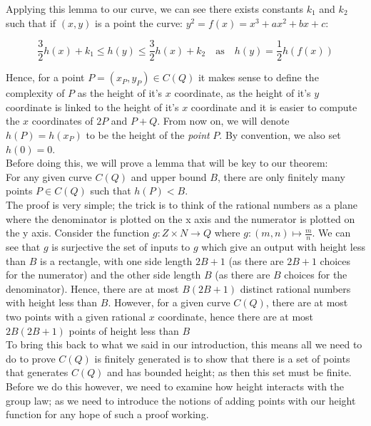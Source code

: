 \documentclass{article}
\begin{document}
Applying this lemma to our curve, we can see there exists constants $k_1$ and $k_2$ such that if $(x, y)$ is a point the curve: $y^2 = f(x) = x^3 + ax^2 + bx + c$:

\[ \frac{3}{2} h(x) + k_1 \leq h(y) \leq \frac{3}{2} h(x) + k_2 \quad \text{as} \quad h(y) = \frac{1}{2}h(f(x)) \]

Hence, for a point $P = (x_P, y_P) \in C(Q)$ it makes sense to define the complexity of $P$ as the height of it's $x$ coordinate, as the height of it's $y$ coordinate is linked to the height of it's $x$ coordinate and it is easier to compute the $x$ coordinates of $2P$ and $P + Q$. From now on, we will denote $h(P) = h(x_P)$ to be the height of the \emph{point} $P$. By convention, we also set $h(0) = 0$.\\

Before doing this, we will prove a lemma that will be key to our theorem:\\

For any given curve $C(Q)$ and upper bound $B$, there are only finitely many points $P \in C(Q)$ such that $h(P) < B$.\\

The proof is very simple; the trick is to think of the rational numbers as a plane where the denominator is plotted on the x axis and the numerator is plotted on the y axis. Consider the function $g: Z \times N \rightarrow Q$ where $g: (m, n) \mapsto \frac{m}{n}$. We can see that $g$ is surjective the set of inputs to $g$ which give an output with height less than $B$ is a rectangle, with one side length $2B + 1$ (as there are $2B + 1$ choices for the numerator) and the other side length $B$ (as there are $B$ choices for the denominator). Hence, there are at most $B(2B + 1)$ distinct rational numbers with height less than $B$. However, for a given curve $C(Q)$, there are at most two points with a given rational $x$ coordinate, hence there are at most $2B(2B + 1)$ points of height less than $B$\\


To bring this back to what we said in our introduction, this means all we need to do to prove $C(Q)$ is finitely generated is to show that there is a set of points that generates $C(Q)$ and has bounded height; as then this set must be finite. Before we do this however, we need to examine how height interacts with the group law; as we need to introduce the notions of adding points with our height function for any hope of such a proof working.\\
\end{document}
